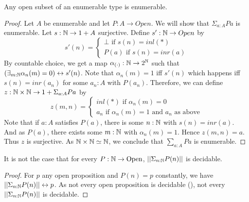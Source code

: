 \begin{lemma}\label{OpenSubsetEnumerableAreEnumerable}
  Any open subset of an enumerable type is enumerable. 
\end{lemma}
\begin{proof}
  Let $A$ be enumerable and let $P:A \to Open$.
  We will show that $\Sigma_{a:A} P a$ is enumerable. 
  Let $s:\mathbb{N} \to 1 + A$ surjective. 
  Define $s':\mathbb{N} \to Open$ by 
  $$
  s'(n) = 
  \begin{cases}
    \bot \text { if } s(n) = inl(*)\\
    P(a) \text { if } s(n) = inr(a)
  \end{cases}
  $$ 
  By countable choice, we get a map 
  $\alpha_{(\cdot)}: \mathbb{N} \to 2^{\mathbb{N}}$  such that 
  $(\exists_{m:\mathbb{N}} \alpha_n(m) = 0) \leftrightarrow s'(n)$. 
  Note that $\alpha_n(m) = 1$ iff 
  $s'(n)$ which happens iff $s(n) = inr(a_n)$ for some $a_n:A$ with $P(a_n)$. 
  Therefore, we can define 
  $z:\mathbb{N} \times \mathbb{N} \to 1 + \Sigma_{a:A} P a$ by 
  \begin{equation}
    z(m,n) = 
    \begin{cases}
      inl(*) \text{ if } \alpha_{n}(m) = 0 \\
      a_n  \text{ if } \alpha_{n}(m) = 1 \text{ and $a_n$ as above}
    \end{cases}
  \end{equation}
  Note that if $a:A$ satisfies $P(a)$, there is some $n:\mathbb{N}$ with $s(n) = inr(a)$. 
  And as $P(a)$, there exists some $m:\mathbb{N}$ with $\alpha_n(m) = 1$. 
  Hence $z(m,n) = a$. 
  Thus $z$ is surjective. 
  As $\mathbb{N} \times \mathbb{N} \simeq \mathbb{N}$, we conclude that 
  $\sum_{a:A} P a$ is enumerable. 
\end{proof}


\begin{lemma}\label{OpenSubsetOfNNotDecidable}
  It is not the case that for every $P:\mathbb{N} \to \mathrm{Open}$, 
  $||\Sigma_{n:\mathbb{N}} P(n)||$ is decidable.
\end{lemma}
\begin{proof}
  For $p$ any open proposition and $P(n) = p$ constantly, we have 
  $||\Sigma_{n:\mathbb{N}} P(n)||\leftrightarrow p$. 
  As not every open proposition is decidable (), 
  not every $||\Sigma_{n:\mathbb{N}} P(n)||$ is decidable. 
\end{proof}

